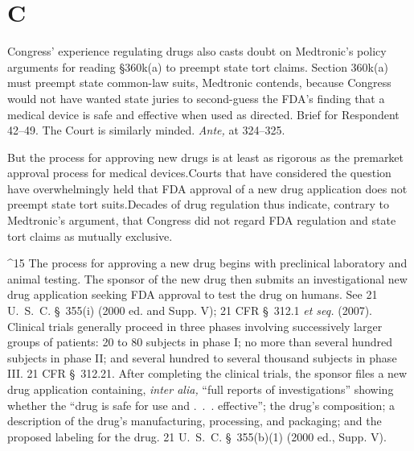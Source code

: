{{{\section{C}

  Congress' experience regulating drugs also casts doubt on
Medtronic's policy arguments for reading \S360k(a) to preempt state
tort claims. Section 360k(a) must preempt state common-law suits,
Medtronic contends, because Congress would not have wanted state juries
to second-guess the FDA's finding that a medical device is safe and
effective when used as directed. Brief for Respondent 42--49. The
Court is similarly minded. \emph{Ante,} at 324--325.

  But the process for approving new drugs is at least as rigorous as the
premarket approval process for medical devices.\footnotemark[15] Courts that have
considered the question have overwhelmingly held that FDA approval of a
new drug application does not preempt state tort suits.\footnotemark[16] Decades
of drug \newpage  regulation thus indicate, contrary to Medtronic's
argument, that Congress did not regard FDA regulation and state tort
claims as mutually exclusive.

^15 The process for approving a new drug begins with preclinical
laboratory and animal testing. The sponsor of the new drug then submits
an investigational new drug application seeking FDA approval to test the
drug on humans. See 21 U.~S.~C. \S~355(i) (2000 ed. and Supp. V);
21 CFR \S~312.1 \emph{et seq.} (2007). Clinical trials generally proceed
in three phases involving successively larger groups of patients: 20 to
80 subjects in phase I; no more than several hundred subjects in phase
II; and several hundred to several thousand subjects in phase III. 21
CFR \S~312.21. After completing the clinical trials, the sponsor
files a new drug application containing, \emph{inter alia,} ``full reports
of investigations'' showing whether the ``drug is safe for use and
.~.~. effective''; the drug's composition; a description of the
drug's manufacturing, processing, and packaging; and the proposed
labeling for the drug. 21 U.~S.~C. \S~355(b)(1) (2000 ed., Supp.
V).

}}}
